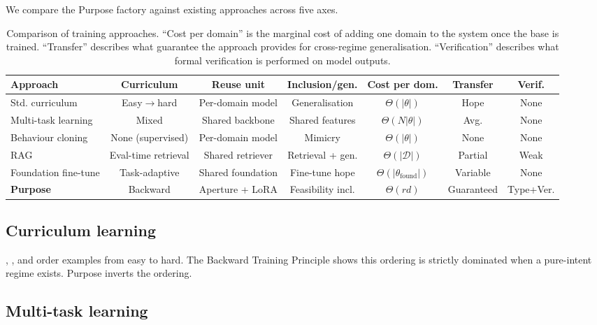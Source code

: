 \documentclass[twocolumn,11pt,a4paper]{article}
\newcommand{\cD}{\mathcal{D}}
\begin{document}
We compare the Purpose factory against existing approaches across five axes.

\begin{table}[!htbp]
\centering
\small
\begin{tabular}{@{}lcccccc@{}}
\toprule
\textbf{Approach} & \textbf{Curriculum} & \textbf{Reuse unit} & \textbf{Inclusion/gen.} & \textbf{Cost per dom.} & \textbf{Transfer} & \textbf{Verif.} \\
\midrule
Std. curriculum & Easy$\to$hard & Per-domain model & Generalisation & $\Theta(|\theta|)$ & Hope & None \\
Multi-task learning & Mixed & Shared backbone & Shared features & $\Theta(N|\theta|)$ & Avg. & None \\
Behaviour cloning & None (supervised) & Per-domain model & Mimicry & $\Theta(|\theta|)$ & None & None \\
RAG & Eval-time retrieval & Shared retriever & Retrieval + gen. & $\Theta(|\cD|)$ & Partial & Weak \\
Foundation fine-tune & Task-adaptive & Shared foundation & Fine-tune hope & $\Theta(|\theta_{\mathrm{found}}|)$ & Variable & None \\
\midrule
\textbf{Purpose} & Backward & Aperture + LoRA & Feasibility incl. & $\Theta(rd)$ & Guaranteed & Type+Ver. \\
\bottomrule
\end{tabular}
\caption{Comparison of training approaches. ``Cost per domain'' is the marginal cost of adding one domain to the system once the base is trained. ``Transfer'' describes what guarantee the approach provides for cross-regime generalisation. ``Verification'' describes what formal verification is performed on model outputs.}
\label{tab:comparison}
\end{table}

\subsection{Curriculum learning}

\citet{bengio2009curriculum}, \citet{graves2017automated}, and \citet{soviany2022curriculum} order examples from easy to hard. The Backward Training Principle shows this ordering is strictly dominated when a pure-intent regime exists. Purpose inverts the ordering.

\subsection{Multi-task learning}
\end{document}
